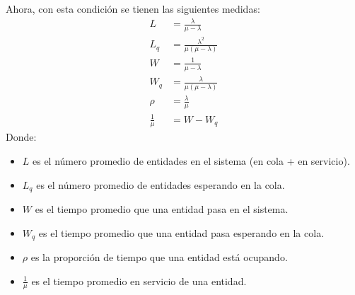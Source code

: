 Ahora, con esta condición se tienen las siguientes medidas:
\begin{align*}
    L &= \frac{\lambda}{\mu - \lambda}\\
    L_q &= \frac{\lambda^2}{\mu(\mu - \lambda)}\\
    W &= \frac{1}{\mu - \lambda}\\
    W_q &= \frac{\lambda}{\mu(\mu - \lambda)}\\
    \rho &= \frac{\lambda}{\mu}\\
    \frac{1}{\mu} &= W - W_q
\end{align*}
Donde:
\begin{itemize}
    \item $L$ es el número promedio de entidades en el sistema (en cola + en servicio).
    \item $L_q$ es el número promedio de entidades esperando en la cola.
    \item $W$ es el tiempo promedio que una entidad pasa en el sistema.
    \item $W_q$ es el tiempo promedio que una entidad pasa esperando en la cola.
    \item $\rho$ es la proporción de tiempo que una entidad está ocupando.
    \item $\frac{1}{\mu}$ es el tiempo promedio en servicio de una entidad.
\end{itemize}